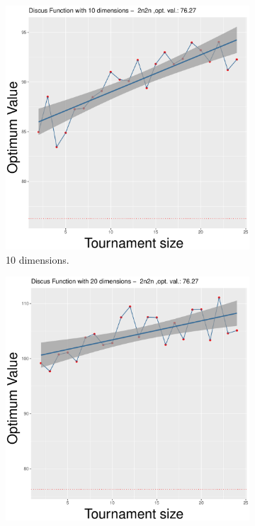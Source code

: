 \begin{figure}[t]
	\begin{subfigure}[b]{0.33\textwidth}
		\centering
		\includegraphics[width=\textwidth]{img/2n2n-10D/unimodal_2n2n_11_dim_10.pdf}
		\caption{10 dimensions.}
	\end{subfigure}
	\begin{subfigure}[b]{0.33\textwidth}
		\centering
		\includegraphics[width=\textwidth]{img/2n2n-20D/unimodal_2n2n_11_dim_20.pdf}

\end{subfigure}
\end{figure}
